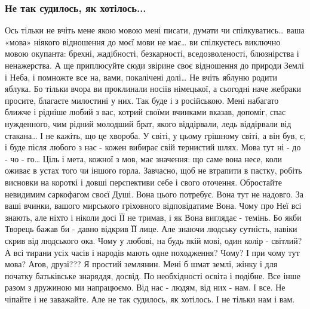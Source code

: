  
 
 
\subsubsection{Не так судилось, як хотілось...}
\label{sec:poetry.rus.mykola_dudar_1950.analytics.ne_tak_sydulos_mova}


Ось тільки не вчіть мене якою мовою мені писати, думати чи спілкуватись… ваша
«мова» ніякого відношення до моєї мови не має… ви спілкуєтесь виключно мовою
окупанта: брехні, жадібності, безкарності, вседозволеності, блюзнірства і
ненажерства. А ще приплюсуйте сюди звірине своє відношення до природи Землі і
Неба, і помножте все на, вами, покалічені долі… Не вчіть яблуню родити яблука.
Бо тільки вчора ви проклинали носіїв німецької, а сьогодні наче жебраки
просите, благаєте милостині у них. Так буде і з російською. Мені набагато
ближче і рідніше любий з вас, котрий своїми вчинками вказав, допоміг, спас
нужденного, чим рідний молодший брат, якого віддірвали, ледь віддірвали від
стакана… І не кажіть, що це хвороба. У світі, у цьому грішному світі, а він
був, є, і буде після любого з нас - кожен вибирає свій тернистий шлях. Мова тут
ні - до - чо - го… Ціль і мета, кожної з мов, має значення: що саме вона несе,
коли оживає в устах того чи іншого горла. Завчасно, щоб не втрапити в пастку,
робіть висновки на короткі і довші перспективи себе і свого оточення.
Обростайте невидимим саркофагом своєї Душі. Вона цього потребує. Вона тут не
надовго. За ваші вчинки, вашого мирського гріховного відповідатиме Вона. Чому
про Неї всі знають, але ніхто і ніколи досі ЇЇ не тримав, і як Вона виглядає -
темінь. Бо якби Творець бажав би - давно відкрив ЇЇ лице. Але знаючи людську
сутність, навіки скрив від людського ока. Чому у любові, на будь якій мові,
один колір - світлий? А всі тирани усіх часів і народів мають одне походження?
Чому? І при чому тут мова? Агов, друзі??? Я простий землянин. Мені б шмат
землі, жінку і для початку батьківське знаряддя, досвід. По необхідності освіта
і подібне. Все інше разом з дружиною ми напрацюємо. Від нас - людям, від них -
нам. І все. Не чіпайте і не заважайте. Але не так судилось, як хотілось. І не
тільки нам і вам. 
